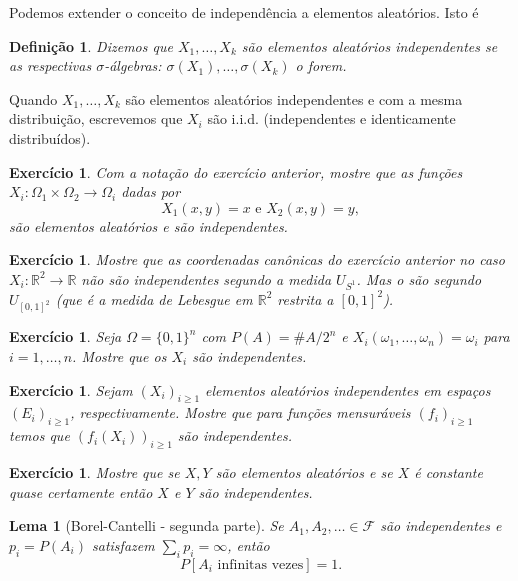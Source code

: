 \documentclass[reqno]{article}
\newcommand*\1{\mathds{1}}
\newtheorem{lemma}[theorem]{Lema}
\newtheorem{definition}[theorem]{Definição}
\newtheorem{exercise}[example]{Exercício}
\begin{document}
Podemos extender o conceito de independência a elementos aleatórios.
Isto é
\begin{definition}
  Dizemos que $X_1, \dots, X_k$ são elementos aleatórios independentes se as respectivas $\sigma$-álgebras: $\sigma(X_1), \dots, \sigma(X_k)$ o forem.
\end{definition}

Quando $X_1, \dots, X_k$ são elementos aleatórios independentes e com a mesma distribuição, escrevemos que $X_i$ são i.i.d. (independentes e identicamente distribuídos).

\begin{exercise}
  Com a notação do exercício anterior, mostre que as funções $X_i:\Omega_1 \times \Omega_2 \to \Omega_i$ dadas por
  \begin{equation}
    X_1(x,y) = x \text{ e } X_2 (x,y) = y,
  \end{equation}
  são elementos aleatórios e são independentes.
\end{exercise}

\begin{exercise}
  Mostre que as coordenadas canônicas do exercício anterior no caso $X_i: \mathbb{R}^2 \to \mathbb{R}$ não são independentes segundo a medida $U_{S^1}$.
  Mas o são segundo $U_{[0,1]^2}$ (que é a medida de Lebesgue em $\mathbb{R}^2$ restrita a $[0,1]^2$).
\end{exercise}

\begin{exercise}
  Seja $\Omega = \{0,1\}^n$ com $P(A) = \#A/2^n$ e $X_i(\omega_1, \dots, \omega_n) = \omega_i$ para $i = 1, \dots, n$.
  Mostre que os $X_i$ são independentes.
\end{exercise}

\begin{exercise}
  Sejam $(X_i)_{i \geq 1}$ elementos aleatórios independentes em espaços $(E_i)_{i \geq 1}$, respectivamente.
  Mostre que para funções mensuráveis $(f_i)_{i \geq 1}$ temos que $(f_i(X_i))_{i \geq 1}$ são independentes.
\end{exercise}

\begin{exercise}
  Mostre que se $X, Y$ são elementos aleatórios e se $X$ é constante quase certamente então $X$ e $Y$ são independentes.
\end{exercise}

\begin{lemma}[Borel-Cantelli - segunda parte]
  Se $A_1, A_2, \dots \in \mathcal{F}$ são independentes e $p_i = P(A_i)$ satisfazem $\sum_i p_i = \infty$, então
  \begin{equation}
    P[A_i \text{ infinitas vezes}] = 1.
  \end{equation}
\end{lemma}
\end{document}
